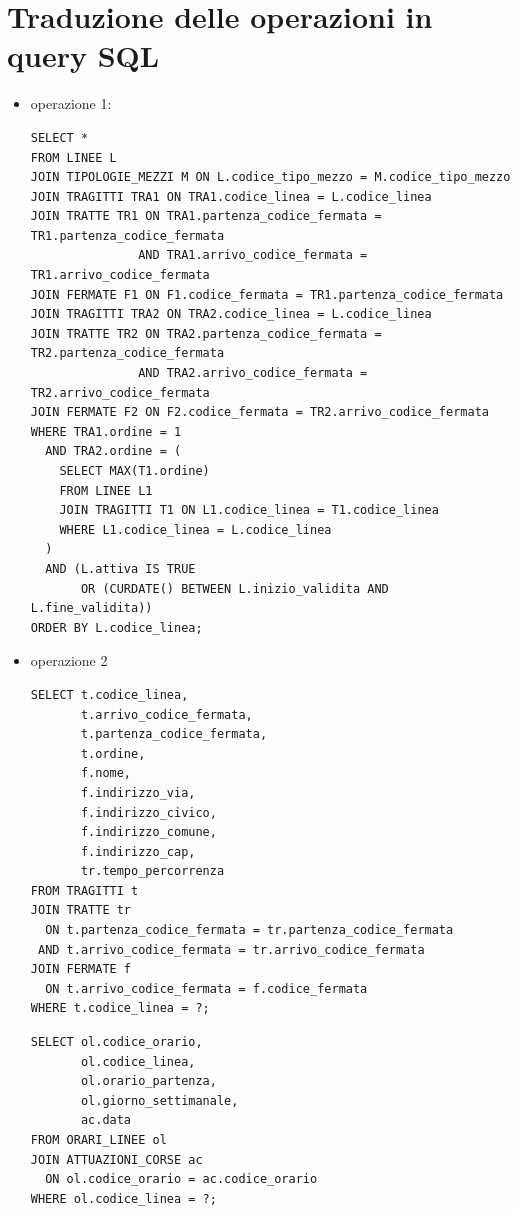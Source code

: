 \documentclass[12pt,a4paper]{report}
\begin{document}
\section{Traduzione delle operazioni in query SQL}
\begin{itemize}
    \item operazione 1:\\
        \begin{lstlisting}[style=sqlstyle, caption=SQL Query operation 1]
SELECT *
FROM LINEE L
JOIN TIPOLOGIE_MEZZI M ON L.codice_tipo_mezzo = M.codice_tipo_mezzo
JOIN TRAGITTI TRA1 ON TRA1.codice_linea = L.codice_linea
JOIN TRATTE TR1 ON TRA1.partenza_codice_fermata = TR1.partenza_codice_fermata
               AND TRA1.arrivo_codice_fermata = TR1.arrivo_codice_fermata
JOIN FERMATE F1 ON F1.codice_fermata = TR1.partenza_codice_fermata
JOIN TRAGITTI TRA2 ON TRA2.codice_linea = L.codice_linea
JOIN TRATTE TR2 ON TRA2.partenza_codice_fermata = TR2.partenza_codice_fermata
               AND TRA2.arrivo_codice_fermata = TR2.arrivo_codice_fermata
JOIN FERMATE F2 ON F2.codice_fermata = TR2.arrivo_codice_fermata
WHERE TRA1.ordine = 1
  AND TRA2.ordine = (
    SELECT MAX(T1.ordine)
    FROM LINEE L1
    JOIN TRAGITTI T1 ON L1.codice_linea = T1.codice_linea
    WHERE L1.codice_linea = L.codice_linea
  )
  AND (L.attiva IS TRUE
       OR (CURDATE() BETWEEN L.inizio_validita AND L.fine_validita))
ORDER BY L.codice_linea;
\end{lstlisting}
    \item operazione 2\\
    \begin{lstlisting}[style=sqlstyle, caption=Query for Fermate Details by Linea]
SELECT t.codice_linea,
       t.arrivo_codice_fermata,
       t.partenza_codice_fermata,
       t.ordine,
       f.nome,
       f.indirizzo_via,
       f.indirizzo_civico,
       f.indirizzo_comune,
       f.indirizzo_cap,
       tr.tempo_percorrenza
FROM TRAGITTI t
JOIN TRATTE tr
  ON t.partenza_codice_fermata = tr.partenza_codice_fermata
 AND t.arrivo_codice_fermata = tr.arrivo_codice_fermata
JOIN FERMATE f
  ON t.arrivo_codice_fermata = f.codice_fermata
WHERE t.codice_linea = ?;
\end{lstlisting}
\begin{lstlisting}[style=sqlstyle, caption=Query for Orari Linee with Attuazioni Corse]
SELECT ol.codice_orario,
       ol.codice_linea,
       ol.orario_partenza,
       ol.giorno_settimanale,
       ac.data
FROM ORARI_LINEE ol
JOIN ATTUAZIONI_CORSE ac
  ON ol.codice_orario = ac.codice_orario
WHERE ol.codice_linea = ?;
\end{lstlisting}


\end{itemize}
\end{document}
